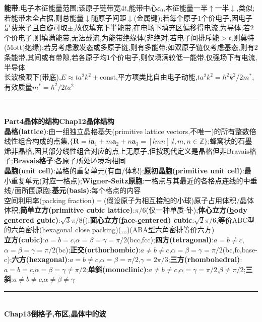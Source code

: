 \documentclass[UTF8,10pt,a4paper]{article}
\begin{document}
\begin{multicols}{2}
\textbf{能带}:电子本征能量范围;该原子链带宽$4t$,能带中心$\varepsilon_0$,本征能量一半$\uparrow$一半$\downarrow$,类似;若能带未全占据,则总能量$\downarrow$随原子间距$\downarrow$(金属键);若每个原子$1$个价电子,因电子是费米子且自旋可取$\pm$,故仅填充下半能带,在电场下填充区偏移得电流,为导体;若$2$个价电子,则填满能带,无法载流,为能带绝缘体(非绝对,若电子间排斥能$>t$,则莫特(Mott)绝缘);若另考虑激发态或多原子链,则有多能带;如双原子链仅考虑基态,则有$2$条能带,其间或有带隙,若各原子均$1$个价电子,则仅填满较低一能带,仅强场下有电流,半导体\\
长波极限下(带底),$E\approx ta^2k^2+$const,平方项类比自由电子动能,$ta^2k^2=\hbar^2k^2/2m^*$,有效质量$m^*=\hbar^2/2ta^2$\\
\rule{\columnwidth}{.2pt}\\
\textbf{Part4晶体的结构Chap12晶体结构}\\
\textbf{晶格(lattice)}:由一组独立晶格基矢(primitive lattice vectors,不唯一)的所有整数倍线性组合构成的点集,$\{\bm{R}=l\bm{a}_1+m\bm{a}_2+n\bm{a}_3=[lmn]\vert l,m,n\in\mathbb{Z}\}$;蜂窝状的石墨烯非晶格,因其部分线性组合对应的点上无原子,但按现代定义是晶格但非Bravais格子;\textbf{Bravais格子}:各原子所处环境均相同\\
\textbf{晶胞(unit cell)}:晶格的重复单元(有面/体积);\textbf{\uline{原}初晶\uline{胞}(primitive unit cell)}:最小重复单元(对应一格点);\textbf{Wigner-Seitz原胞}:一格点与其最近的各格点连线的中垂线/面所围原胞;\textbf{基元(basis)}:每个格点的内容\\
空间利用率(packing fraction)$=$(假设原子为相互接触的小球)原子占用体积$/$晶体体积;\textbf{简单立方(primitive cubic lattice)}:$\pi/6$(仅一种单质-钋);\textbf{体心立方(\uline{b}ody \uline{c}entered \uline{c}ubic)}:$\sqrt{3}\pi/8$();\textbf{面心立方(\uline{f}ace-\uline{c}entered) cubic}:$\sqrt{2}\pi/6$,等价ABC型的六角密排(hexagonal close packing)(,,,)(ABA型六角密排等价六方)\\
\textbf{立方(cubic)}:$a=b=c$,$\alpha=\beta=\gamma=\pi/2$(bcc,fcc);\textbf{四方(tetragonal)}:$a=b\neq c$,$\alpha=\beta=\gamma=\pi/2$(bc);\textbf{正交(orthorhombic)}:$a\neq b\neq c$,$\alpha=\beta=\gamma=\pi/2$(bc,fc,base-c);\textbf{六方(hexagonal)}:$a=b\neq c$,$\alpha=\beta=\pi/2$,$\gamma=2\pi/3$;\textbf{三方(rhombohedral)}:$a=b=c$,$\alpha=\beta=\gamma\neq\pi/2$;\textbf{单斜(monoclinic)}:$a\neq b\neq c$,$\alpha=\gamma=\pi/2$,$\beta\neq\pi/2$;\textbf{三斜}:$a\neq b\neq c$,$\alpha\neq\beta\neq\gamma$\\
\rule{\columnwidth}{.2pt}\\
\textbf{Chap13倒格子,布区,晶体中的波}\\

\end{multicols}
\end{document}
